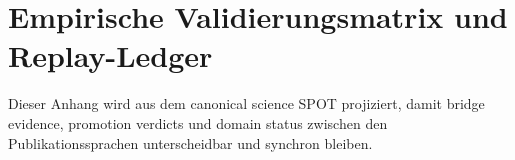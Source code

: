 \section{Empirische Validierungsmatrix und Replay-Ledger}
\label{sec:oc-core-1-3-empirical-validation-matrix-de}
\label{sec:oc-core-1-3-empirical-validation-matrix}

Dieser Anhang wird aus dem canonical science SPOT projiziert, damit bridge
evidence, promotion verdicts und domain status zwischen den
Publikationssprachen unterscheidbar und synchron bleiben.

\begingroup
\footnotesize
\RaggedRight
\sloppy
\setlength{\tabcolsep}{2pt}
\setlength{\LTleft}{0pt}
\setlength{\LTright}{0pt}

\endgroup
